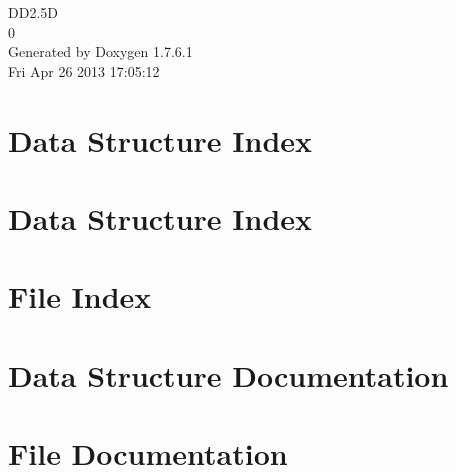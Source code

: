 \documentclass[a4paper]{book}
\begin{document}
\hypersetup{pageanchor=false,citecolor=blue}
\begin{titlepage}
\vspace*{7cm}
\begin{center}
{\Large \-D\-D2.5\-D \\[1ex]\large 0 }\\
\vspace*{1cm}
{\large \-Generated by Doxygen 1.7.6.1}\\
\vspace*{0.5cm}
{\small Fri Apr 26 2013 17:05:12}\\
\end{center}
\end{titlepage}
\clearemptydoublepage
{}
\tableofcontents
\clearemptydoublepage
{}
\hypersetup{pageanchor=true,citecolor=blue}
\chapter{\-Data \-Structure \-Index}

\chapter{\-Data \-Structure \-Index}

\chapter{\-File \-Index}

\chapter{\-Data \-Structure \-Documentation}







\chapter{\-File \-Documentation}
















\printindex
\end{document}
